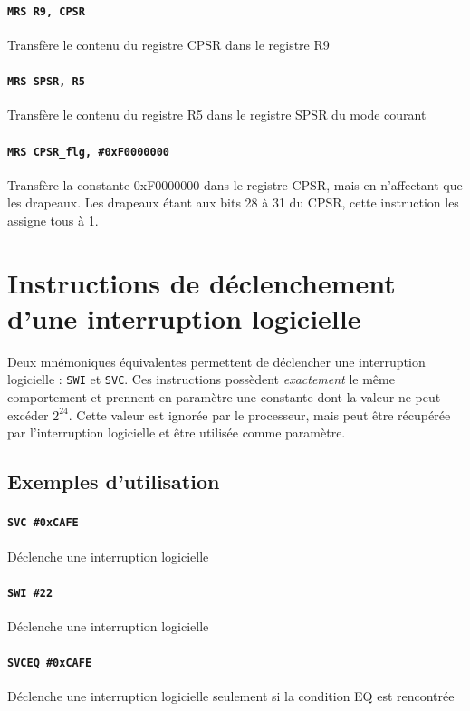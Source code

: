\documentclass{tufte-handout}
\begin{document}
\paragraph{\texttt{MRS R9, CPSR}} Transfère le contenu du registre CPSR dans le registre R9

\paragraph{\texttt{MRS SPSR, R5}} Transfère le contenu du registre R5 dans le registre SPSR du mode courant


\paragraph{\texttt{MRS CPSR\_flg, \#0xF0000000}} Transfère la constante 0xF0000000 dans le registre CPSR, mais en n'affectant que les drapeaux. Les drapeaux étant aux bits 28 à 31 du CPSR, cette instruction les assigne tous à 1.

\clearpage
\section{Instructions de déclenchement d'une interruption logicielle}

Deux mnémoniques équivalentes permettent de déclencher une interruption logicielle : \texttt{SWI} et \texttt{SVC}. Ces instructions possèdent \textit{exactement} le même comportement et prennent en paramètre une constante dont la valeur ne peut excéder $2^24$. Cette valeur est ignorée par le processeur, mais peut être récupérée par l'interruption logicielle et être utilisée comme paramètre.

\subsection{Exemples d'utilisation}

\paragraph{\texttt{SVC \#0xCAFE}} Déclenche une interruption logicielle
\paragraph{\texttt{SWI \#22}} Déclenche une interruption logicielle
\paragraph{\texttt{SVCEQ \#0xCAFE}} Déclenche une interruption logicielle seulement si la condition EQ est rencontrée
\end{document}
